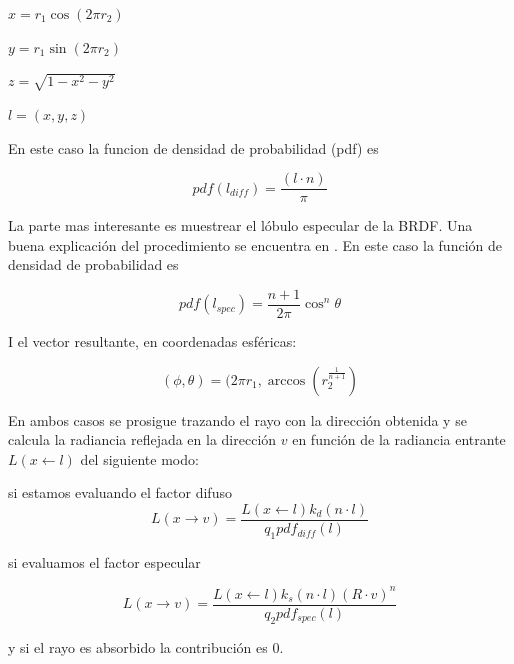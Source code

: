 \smallskip

$x = r_1 \cos (2\pi r_2)$

\smallskip

$y = r_1 \sin (2\pi r_2)$

\smallskip

$z = \sqrt{1 - x^2 - y^2}$

\smallskip

$l = (x, y, z)$

\medskip

En este caso la funcion de densidad de probabilidad (pdf) es

\smallskip

\begin{equation}
pdf(l_{diff}) = \frac{(l \cdot n)}{\pi}
\end{equation}

La parte mas interesante es muestrear el lóbulo especular de la BRDF. Una buena explicación del procedimiento se encuentra en \cite{Lafortune1994}. En este caso la función de densidad de probabilidad es

\begin{equation}
pdf(l_{spec}) = \frac{n + 1}{2\pi}\cos^n\theta
\end{equation}

I el vector resultante, en coordenadas esféricas:

\begin{equation}
(\phi, \theta) = (2\pi r_1, \arccos(r_2^{\frac{1}{n+1}}) 
\end{equation}

En ambos casos se prosigue trazando el rayo con la dirección obtenida y se calcula la radiancia reflejada en la dirección $v$ en función de la radiancia entrante $L(x \gets l)$ del siguiente modo:
\medskip

si estamos evaluando el factor difuso
\begin{equation}
L(x \to v) = \frac{L(x \gets l)k_d(n \cdot l)}{q_1 pdf_{diff}(l)}
\end{equation}

si evaluamos el factor especular

\begin{equation}
L(x \to v) = \frac{L(x \gets l)k_s(n \cdot l)(R \cdot v)^n}{q_2 pdf_{spec}(l)}
\end{equation}

y si el rayo es absorbido la contribución es 0.




\clearpage

